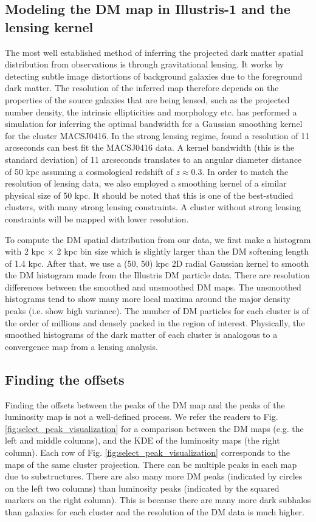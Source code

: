 \subsection{Modeling the DM map in Illustris-1 and the lensing kernel}
The most well established method of inferring the projected dark matter spatial 
distribution from observations is through gravitational lensing.
It works by detecting subtle image distortions of background galaxies due to
the foreground dark matter. The resolution of the inferred map therefore 
depends on the properties of the source galaxies that are being lensed, 
such as the projected number density, the intrinsic ellipticities and morphology etc.
\cite{Hoag2016} has performed a simulation for inferring the optimal bandwidth
for a Gaussian smoothing kernel for the cluster MACSJ0416. 
In the strong lensing regime, \cite{Hoag2016} found a resolution of 11 arcseconds
can best fit the MACSJ0416 data. A kernel bandwidth (this is the standard deviation) 
of 11 arcseconds translates to an angular diameter distance of 50 
kpc assuming a cosmological redshift of $z \approx 0.3$. 
In order to match the resolution of lensing data,
we also employed a smoothing kernel of a similar physical size of 50 kpc.  
It should be noted that this is one of the best-studied clusters, 
with many strong lensing constraints. 
A cluster without strong lensing constraints will be mapped with 
lower resolution.

To compute the DM spatial distribution from our data, we first make a histogram with 2 kpc
$\times$ 2 kpc bin size which is slightly larger than the DM softening length of 1.4 kpc. 
After that, we use a (50, 50) kpc 2D radial Gaussian kernel 
to smooth the DM histogram made from the Illustris DM
particle data. 
There are resolution differences between the smoothed and unsmoothed DM
maps. The unsmoothed histograms tend to show many more local maxima around the major
density peaks (i.e. show high variance). 
The number of DM particles for each cluster is of 
the order of millions and densely packed in the region of
interest. 
Physically, the smoothed histograms of the dark matter of each cluster 
is analogous to a convergence map from a lensing analysis. 


\subsection{Finding the offsets} \label{subsec:offsets}
Finding the offsets between the peaks of the DM map and the peaks of the 
luminosity map is not a well-defined process. 
We refer the readers to Fig. \ref{fig:select_peak_visualization} for a comparison
between the DM maps (e.g. the left and middle columns), and 
the KDE of the luminosity maps (the right column).
Each row of Fig. \ref{fig:select_peak_visualization} corresponds to the maps of
the same cluster projection.
There can be multiple peaks in each map due to substructures. 
There are also many more DM peaks (indicated by circles on the left two columns) 
than luminosity peaks (indicated by the squared markers on the right column).
This is because there are many more dark subhalos than galaxies for each cluster and 
the resolution of the DM data is much higher. 

